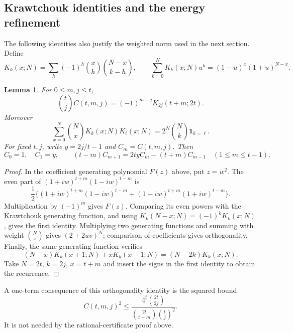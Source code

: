 \documentclass[11pt,a4paper]{article}
\newtheorem{lemma}[theorem]{Lemma}
\theoremstyle{definition}
\theoremstyle{remark}
\numberwithin{equation}{section}
\begin{document}
\subsection{Krawtchouk identities and the energy refinement}

The following identities also justify the weighted norm used in the next
section. Define
\[
 K_k(x;N)=\sum_h(-1)^h\binom xh\binom{N-x}{k-h},\qquad
 \sum_{k=0}^NK_k(x;N)u^k=(1-u)^x(1+u)^{N-x}.
\]
\begin{lemma}\label{E:cba:kraw}
For $0\le m,j\le t$,
\[
 \binom tjC(t,m,j)=(-1)^{m+j}K_{2j}(t+m;2t).
\]
Moreover
\[
 \sum_{x=0}^N\binom NxK_k(x;N)K_\ell(x;N)
                       =2^N\binom Nk\mathbf1_{k=\ell}.
\]
For fixed $t,j$, write $y=2j/t-1$ and $C_m=C(t,m,j)$. Then
\[
 C_0=1,\quad C_1=y,\qquad
 (t-m)C_{m+1}=2tyC_m-(t+m)C_{m-1}
                           \quad(1\le m\le t-1).
\]
\end{lemma}
\begin{proof}
In the coefficient generating polynomial $F(z)$ above, put $z=w^2$.
The even part of $(1+iw)^{t+m}(1-iw)^{t-m}$ is
\[
 \frac12\{(1+iw)^{t+m}(1-iw)^{t-m}
          +(1-iw)^{t+m}(1+iw)^{t-m}\}.
\]
Multiplication by $(-1)^m$ gives $F(z)$. Comparing its even powers
with the Krawtchouk generating function, and using
$K_k(N-x;N)=(-1)^kK_k(x;N)$, gives the first identity.
Multiplying two generating functions and summing with weight
$\binom Nx$ gives $(2+2uv)^N$; comparison of coefficients gives
orthogonality. Finally, the same generating function verifies
\[
 (N-x)K_k(x+1;N)+xK_k(x-1;N)=(N-2k)K_k(x;N).
\]
Take $N=2t$, $k=2j$, $x=t+m$ and insert the signs in the first
identity to obtain the recurrence.
\end{proof}

A one-term consequence of this orthogonality identity is the
squared bound
\[
 C(t,m,j)^2\le
       \frac{4^t\binom{2t}{2j}}
            {\binom{2t}{t+m}\binom tj^2}.
\]
It is not needed by the rational-certificate proof above.
\end{document}
